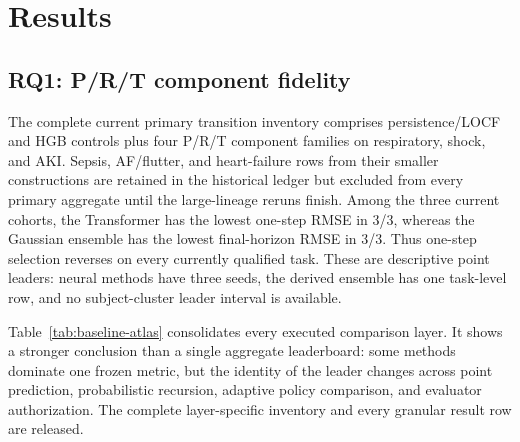 \documentclass[sigconf,review]{acmart}
\begin{document}
\section{Results}

\subsection{RQ1: P/R/T component fidelity}

The complete current primary transition inventory comprises persistence/LOCF and HGB controls plus four P/R/T component families on respiratory, shock, and AKI. Sepsis, AF/flutter, and heart-failure rows from their smaller constructions are retained in the historical ledger but excluded from every primary aggregate until the large-lineage reruns finish. Among the three current cohorts, the Transformer has the lowest one-step RMSE in 3/3, whereas the Gaussian ensemble has the lowest final-horizon RMSE in 3/3. Thus one-step selection reverses on every currently qualified task. These are descriptive point leaders: neural methods have three seeds, the derived ensemble has one task-level row, and no subject-cluster leader interval is available.

Table~\ref{tab:baseline-atlas} consolidates every executed comparison layer. It shows a stronger conclusion than a single aggregate leaderboard: some methods dominate one frozen metric, but the identity of the leader changes across point prediction, probabilistic recursion, adaptive policy comparison, and evaluator authorization. The complete layer-specific inventory and every granular result row are released.
\end{document}
